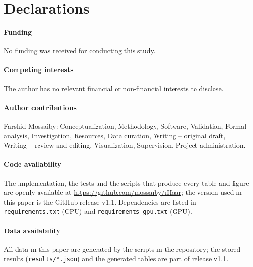 \documentclass[smallextended,envcountsame]{svjour3}
\newcommand{\repo}{\url{https://github.com/mossaiby/iHaar}}
\begin{document}
\section*{Declarations}
\paragraph{Funding} No funding was received for conducting this study.

\paragraph{Competing interests} The author has no relevant financial or non-financial interests to disclose.

\paragraph{Author contributions} Farshid Mossaiby: Conceptualization, Methodology, Software, Validation,
Formal analysis, Investigation, Resources, Data curation, Writing -- original draft, Writing -- review and
editing, Visualization, Supervision, Project administration.

\paragraph{Code availability} The implementation, the tests and the scripts that produce every table and
figure are openly available at \repo; the version used in this paper is the GitHub release v1.1. Dependencies
are listed in \texttt{requirements.txt} (CPU) and \texttt{requirements-gpu.txt} (GPU).

\paragraph{Data availability} All data in this paper are generated by the scripts in the repository; the
stored results (\texttt{results/*.json}) and the generated tables are part of release v1.1.


\appendix
\end{document}
